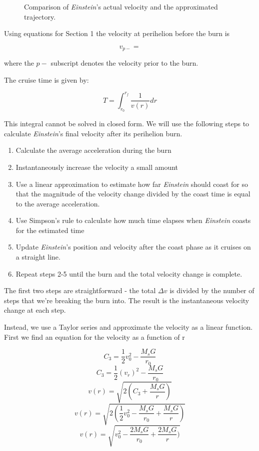 \documentclass[12pt]{article} %
\begin{document}
\begin{figure}[H]

\caption{Comparison of \textit{Einstein}'s actual velocity and the approximated trajectory.}

\end{figure}

Using equations for Section 1 the velocity at perihelion before the burn is 

$$v_{p-} = $$

where the $p-$ subscript denotes the velocity prior to the burn. 

The cruise time is given by: 

$$T = \int_{r_0}^{r_f} \frac{1}{v(r)} dr$$

This integral cannot be solved in closed form.
We will use the following steps to calculate \textit{Einstein}'s final velocity after its perihelion burn.

\begin{enumerate}
\item Calculate the average acceleration during the burn
\item Instantaneously increase the velocity a small amount
\item Use a linear approximation to estimate how far \textit{Einstein} should coast for so that the magnitude of the velocity change divided by the coast time is equal to the average acceleration.
\item Use Simpson's rule to calculate how much time elapses when \textit{Einstein} coasts for the estimated time
\item Update \textit{Einstein}'s position and velocity after the coast phase as it cruises on a straight line.
\item Repeat steps 2-5 until the burn and the total velocity change is complete.
\end{enumerate}

The first two steps are straightforward - the total $\Delta v$ is divided by the number of steps that we're breaking the burn into. The result is the instantaneous velocity change at each step.

 Instead, we use a Taylor series and approximate the velocity as a linear function. First we find an equation for the velocity as a function of r

$$C_3 = \frac{1}{2}v_0^2-\frac{M_sG}{r_0}$$
$$C_3 = \frac{1}{2}(v_r)^2 - \frac{M_sG}{r_0}$$
$$v(r) = \sqrt{2  (C_3 + \frac{M_sG}{r})}$$
$$v(r) = \sqrt{2  (\frac{1}{2}v_0^2-\frac{M_sG}{r_0} + \frac{M_sG}{r})}$$
$$v(r) = \sqrt{v_0^2-\frac{2M_sG}{r_0} + \frac{2M_sG}{r})}$$
\end{document}

